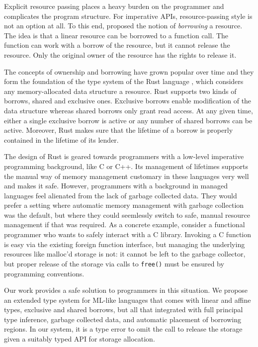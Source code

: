 Explicit resource passing places a heavy burden on the programmer and
complicates the program structure. For imperative APIs,
resource-passing style is not an option at all. To this end,
\citet{DBLP:conf/popl/BoylandR05}  proposed the notion of
\emph{borrowing} a resource. The idea is that a linear resource can be
borrowed to a function call. The function can work with a borrow of
the resource, but it cannot release the resource. Only the original
owner of the resource has the rights to release it.

The concepts of ownership and borrowing have grown popular over time
and they form the foundation of the type system of the Rust language
\cite{rust}, which considers any memory-allocated data structure a
resource. Rust supports two kinds of borrows,
shared and exclusive ones.
Exclusive borrows enable modification of the data structure
whereas shared borrows only grant read access.
At any given time, either a single exclusive borrow is active or
any number of shared borrows can be active.
Moreover, Rust makes sure that the lifetime of a
borrow is properly contained in the lifetime of its lender.

The design of Rust is geared towards programmers with a low-level
imperative programming background, like C or C++. Its management of
lifetimes supports the manual way of memory management customary in
these languages very well and makes it safe. However, programmers with
a background in managed languages feel alienated from the lack of garbage
collected data. They would prefer a setting where automatic memory
management with garbage collection was the default, but where they
could seemlessly switch to safe, manual resource management if that
was required.
%
As a concrete example, consider a functional programmer who wants to
safely interact with a C library. Invoking a C function is easy via
the existing foreign function interface, but managing the underlying
resources like malloc'd storage is not: it cannot be left to the
garbage collector, but proper release of the storage via calls to \texttt{free()} must be
ensured by programming conventions.

Our work provides a safe solution to programmers in this situation. We
propose an extended type system for ML-like languages that comes with
linear and affine types, exclusive and shared borrows, but all that
integrated with full principal type inference, garbage collected data, and
automatic placement of borrowing regions.
In our system, it is a type error to omit the call to release the
storage given a suitably typed API for storage allocation.


